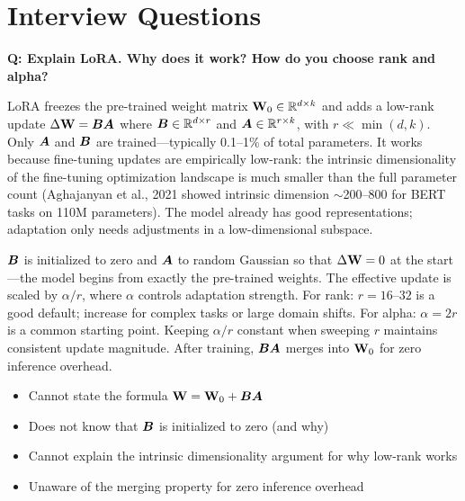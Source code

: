 \section{Interview Questions}
\label{sec:pretraining-questions}

\begin{interviewq}
\textbf{Q: Explain LoRA. Why does it work? How do you choose rank and alpha?}

 \quad {} \quad \badgefreq{\freqhigh}

\stronganswer
LoRA freezes the pre-trained weight matrix $\mathbf{W}_0 \in \mathbb{R}^{d \times k}$ and adds a
low-rank update $\Delta\mathbf{W} = \bm{B}\bm{A}$ where $\bm{B} \in \mathbb{R}^{d \times r}$ and
$\bm{A} \in \mathbb{R}^{r \times k}$, with $r \ll \min(d, k)$.  Only $\bm{A}$ and $\bm{B}$ are
trained---typically 0.1--1\% of total parameters.  It works because fine-tuning
updates are empirically low-rank: the intrinsic dimensionality of the fine-tuning
optimization landscape is much smaller than the full parameter count (Aghajanyan
et al., 2021 showed intrinsic dimension $\sim$200--800 for BERT tasks on 110M
parameters).  The model already has good representations; adaptation only needs
adjustments in a low-dimensional subspace.

$\bm{B}$ is initialized to zero and $\bm{A}$ to random Gaussian so that $\Delta\mathbf{W} = 0$
at the start---the model begins from exactly the pre-trained weights.  The effective
update is scaled by $\alpha/r$, where $\alpha$ controls adaptation strength.  For
rank: $r = 16$--$32$ is a good default; increase for complex tasks or large domain
shifts.  For alpha: $\alpha = 2r$ is a common starting point.  Keeping $\alpha/r$
constant when sweeping $r$ maintains consistent update magnitude.  After training,
$\bm{B}\bm{A}$ merges into $\mathbf{W}_0$ for zero inference overhead.

\redflags
\begin{itemize}
    \item Cannot state the formula $\mathbf{W} = \mathbf{W}_0 + \bm{B}\bm{A}$
    \item Does not know that $\bm{B}$ is initialized to zero (and why)
    \item Cannot explain the intrinsic dimensionality argument for why low-rank works
    \item Unaware of the merging property for zero inference overhead
\end{itemize}


\end{interviewq}
